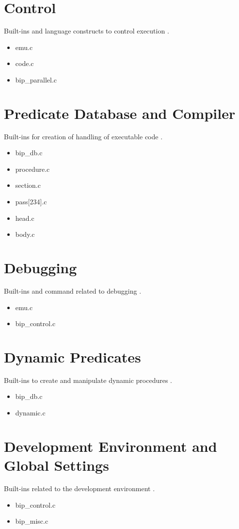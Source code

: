 \section{Control }
     Built-ins and language constructs to control execution .
     \begin{itemize}
     \item emu.c
     \item code.c
     \item bip_parallel.c
     \end{itemize}

\section{Predicate Database and Compiler }
     Built-ins for creation of handling of executable code .
     \begin{itemize}
     \item bip_db.c
     \item procedure.c
     \item section.c
     \item pass[234].c
     \item head.c
     \item body.c
     \end{itemize}

\section{Debugging }
     Built-ins and command related to debugging .
     \begin{itemize}
     \item emu.c
     \item bip_control.c
     \end{itemize}

\section{Dynamic Predicates }
     Built-ins to create and manipulate dynamic procedures .
     \begin{itemize}
     \item bip_db.c
     \item dynamic.c
     \end{itemize}

\section{Development Environment and Global Settings }
     Built-ins related to the development environment .
     \begin{itemize}
     \item bip_control.c
     \item bip_misc.c
     \end{itemize}

